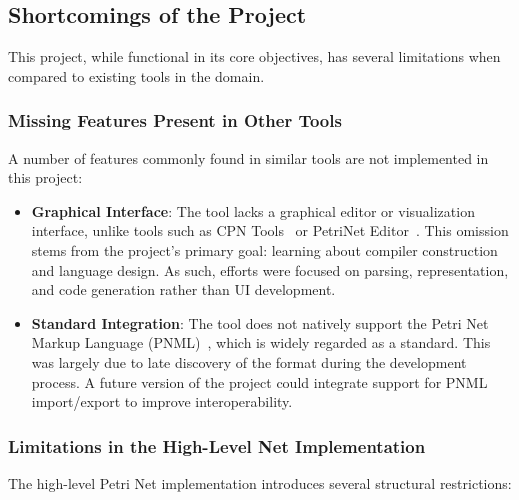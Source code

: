 \documentclass[12pt]{article}
\begin{document}
    \subsection{Shortcomings of the Project}

        This project, while functional in its core objectives, has several limitations when compared to existing tools in the domain.

        \subsubsection{Missing Features Present in Other Tools}

            A number of features commonly found in similar tools are not implemented in this project:
            \begin{itemize}
                \item \textbf{Graphical Interface}: The tool lacks a graphical editor or visualization interface, unlike tools such as CPN Tools~\cite{verbeek2021cpn} or PetriNet Editor~\cite{app10217662}. This omission stems from the project's primary goal: learning about compiler construction and language design. As such, efforts were focused on parsing, representation, and code generation rather than UI development.
                \item \textbf{Standard Integration}: The tool does not natively support the Petri Net Markup Language (PNML)~\cite{weber2003petri}, which is widely regarded as a standard. This was largely due to late discovery of the format during the development process. A future version of the project could integrate support for PNML import/export to improve interoperability.
            \end{itemize}

        \subsubsection{Limitations in the High-Level Net Implementation}

            The high-level Petri Net implementation introduces several structural restrictions:
\end{document}
